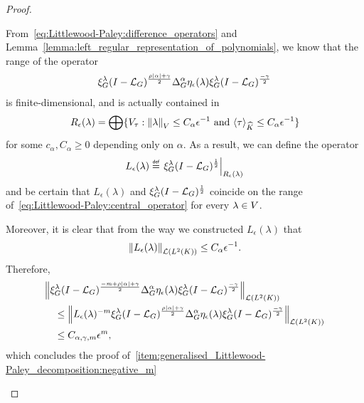 \begin{proof}
\begin{description}
            From~\eqref{eq:Littlewood-Paley:difference_operators} and Lemma~\ref{lemma:left_regular_representation_of_polynomials},
            we know that the range of the operator
            \begin{align}
                \Rep \lambda \BesselPotential {\rho \abs \alpha + \gamma}
                \DifferenceOperatorOrder \alpha \eta_\epsilon(\lambda)
                \Rep \lambda \BesselPotential {-\gamma}
                \label{eq:Littlewood-Paley:central_operator}
            \end{align}
            is finite-dimensional,
            and is actually contained in
            \begin{align*}
                R_\epsilon(\lambda) =
                \bigoplus \{V_\tau : \norm \lambda \leq C_\alpha \epsilon^{-1} \text{ and } \JapaneseBracket \CompactGroup \tau \leq C_\alpha \epsilon^{-1} \}
            \end{align*}
            for some $c_\alpha, C_\alpha \geq 0$ depending only on $\alpha$.
            As a result,
            we can define the operator
            \begin{align*}
                L_\epsilon(\lambda) \defeq
                \eval {\Rep \lambda \BesselPotential 1} {R_\epsilon(\lambda)}
            \end{align*}
            and be certain that $L_\epsilon(\lambda)$ and $\Rep \lambda \BesselPotential 1$ coincide on the range of~\eqref{eq:Littlewood-Paley:central_operator}
            for every $\lambda \in \VectorSpace$.

            Moreover,
            it is clear that from the way we constructed $L_\epsilon(\lambda)$ that
            \begin{align*}
                \norm [\Lin {\Lebesgue 2 \CompactGroup}] {L_\epsilon(\lambda)} \leq C_\alpha \epsilon^{-1}.
            \end{align*}
            Therefore,
            \begin{align*}
                &\norm [\Lin {\Lebesgue 2 \CompactGroup}] {%
                    \Rep \lambda \BesselPotential {-m + \rho \abs\alpha + \gamma}
                    \DifferenceOperatorOrder \alpha \eta_\epsilon(\lambda)
                    \Rep \lambda \BesselPotential {-\gamma}
                }\\
                &\quad \leq \norm [\Lin {\Lebesgue 2 \CompactGroup}] {%
                    L_\epsilon(\lambda)^{-m}
                    \Rep \lambda \BesselPotential {\rho \abs \alpha + \gamma}
                    \DifferenceOperatorOrder \alpha \eta_\epsilon(\lambda)
                    \Rep \lambda \BesselPotential {-\gamma}
                }\\
                &\quad \leq C_{\alpha, \gamma, m} \epsilon^{m},
            \end{align*}
            which concludes the proof of~\ref{item:generalised_Littlewood-Paley_decomposition:negative_m}


\end{description}
\end{proof}
